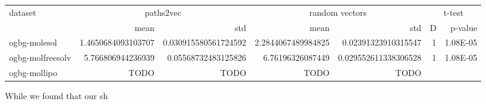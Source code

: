 \begin{table}[]
    \begin{tabular}{@{}lrrrrrr@{}}
        \toprule
        dataset          & \multicolumn{2}{c}{paths2vec} & \multicolumn{2}{c}{random vectors} & \multicolumn{2}{c}{t-test}                                       \\ \cmidrule(l){2-3}\cmidrule(l){4-5}\cmidrule(l){6-7}
                         & mean                          & std                                & mean                       & std                  & D & p-value  \\ \midrule
        ogbg-molesol     & 1.4650684093103707            & 0.030915580561724592               & 2.2844067489984825         & 0.02391323910315547  & 1 & 1.08E-05 \\
        ogbg-molfreesolv & 5.766806944236939             & 0.05568732483125826                & 6.76196326087449           & 0.029552611338306528 & 1 & 1.08E-05 \\
        ogbg-mollipo     & TODO                          & TODO                               & TODO                       & TODO                 &   &          \\ \bottomrule
    \end{tabular}
\end{table}

%
%
%
%

%

While we found that our sh
